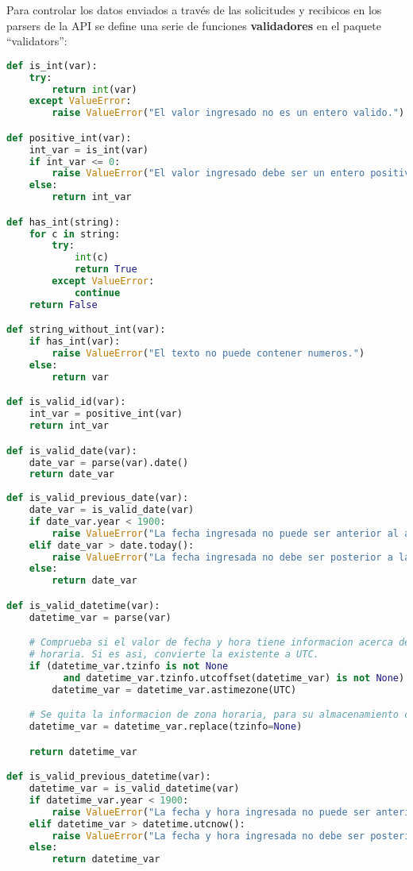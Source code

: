 Para controlar los datos enviados a través de las solicitudes y recibicos en los parsers de la API se define una serie de funciones \textbf{validadores} en el paquete ``validators'':

\begin{lstlisting}[language=Python]
def is_int(var):
    try:
        return int(var)
    except ValueError:
        raise ValueError("El valor ingresado no es un entero valido.")

def positive_int(var):
    int_var = is_int(var)
    if int_var <= 0:
        raise ValueError("El valor ingresado debe ser un entero positivo.")
    else:
        return int_var

def has_int(string):
    for c in string:
        try:
            int(c)
            return True
        except ValueError:
            continue
    return False

def string_without_int(var):
    if has_int(var):
        raise ValueError("El texto no puede contener numeros.")
    else:
        return var

def is_valid_id(var):
    int_var = positive_int(var)
    return int_var

def is_valid_date(var):
    date_var = parse(var).date()
    return date_var
    
def is_valid_previous_date(var):
    date_var = is_valid_date(var)
    if date_var.year < 1900:
        raise ValueError("La fecha ingresada no puede ser anterior al anio 1900.")
    elif date_var > date.today():
        raise ValueError("La fecha ingresada no debe ser posterior a la fecha actual.")
    else:
        return date_var

def is_valid_datetime(var):
    datetime_var = parse(var)

    # Comprueba si el valor de fecha y hora tiene informacion acerca de la zona
    # horaria. Si es asi, convierte la existente a UTC.
    if (datetime_var.tzinfo is not None
          and datetime_var.tzinfo.utcoffset(datetime_var) is not None):
        datetime_var = datetime_var.astimezone(UTC)

    # Se quita la informacion de zona horaria, para su almacenamiento como UTC.
    datetime_var = datetime_var.replace(tzinfo=None)

    return datetime_var

def is_valid_previous_datetime(var):
    datetime_var = is_valid_datetime(var)
    if datetime_var.year < 1900:
        raise ValueError("La fecha y hora ingresada no puede ser anterior al anio 1900.")
    elif datetime_var > datetime.utcnow():
        raise ValueError("La fecha y hora ingresada no debe ser posterior a la fecha y hora actual.")
    else:
        return datetime_var


\end{lstlisting}
